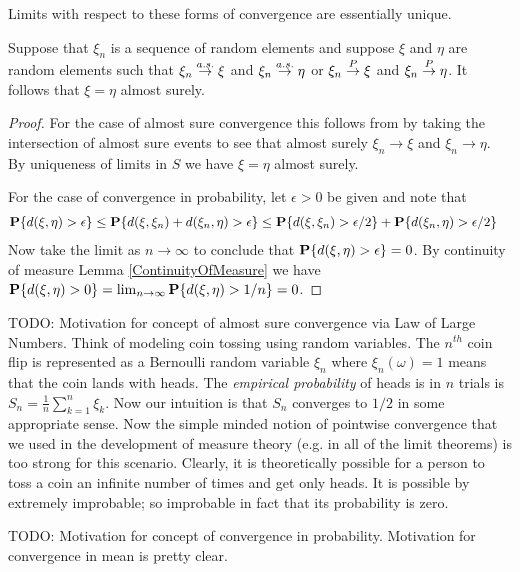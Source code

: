 Limits with respect to these forms of convergence are essentially
unique.
\begin{prop}\label{AlmostSureUniquenessOfLimits}Suppose that $\xi_n$ is a sequence of random elements and
  suppose $\xi$ and $\eta$ are random elements such that $\xi_n \overset{a.s.}\to
  \xi$ and $\xi_n \overset{a.s.}\to \eta$ or $\xi_n \overset{P}\to
  \xi$ and $\xi_n \overset{P}\to \eta$.  It follows that $\xi = \eta$
  almost surely.
\end{prop}
\begin{proof}
For the case  of almost sure convergence this follows from by taking
the intersection of almost sure events to see that almost surely
$\xi_n \to \xi$ and $\xi_n \to \eta$.  By uniqueness of limits in $S$
we have $\xi = \eta$ almost surely.

For the case of convergence in probability, let $\epsilon > 0$ be
given and note that 
\begin{align*}
\textbf{P}\{ d(\xi, \eta) > \epsilon\} &\leq \textbf{P}\{ d(\xi,
  \xi_n )  + d(\xi_n , \eta) > \epsilon\} \leq  \textbf{P}\{ d(\xi,
  \xi_n ) > \epsilon/2 \} + \textbf{P}\{ d(\xi_n , \eta) > \epsilon/2\} 
\end{align*}
Now take the limit as $n \to \infty$ to conclude that $\textbf{P}\{
  d(\xi, \eta) > \epsilon\} = 0$.  By continuity of measure Lemma
\ref{ContinuityOfMeasure} we have $\textbf{P}\{d(\xi, \eta) > 0\} =
\lim_{n \to \infty} \textbf{P}\{d(\xi, \eta) > 1/n\} = 0$.
\end{proof}

TODO: Motivation for concept of almost sure convergence via Law of
Large Numbers.  Think of modeling coin tossing using random
variables.  The $n^{th}$ coin flip is represented as a Bernoulli
random variable $\xi_n$ where $\xi_n(\omega) = 1$ means that the coin
lands with heads.  The \emph{empirical probability} of heads is in $n$
trials is $S_n = \frac{1}{n} \sum_{k=1}^n \xi_k$.  Now our intuition
is that $S_n$ converges to $1/2$ in some appropriate sense.  Now the
simple minded notion of pointwise convergence that we used in the
development of measure theory (e.g. in all of the limit theorems)
is too strong for this scenario.  Clearly, it is theoretically
possible for a person to toss a coin an infinite number of times and
get only heads.  It is possible by extremely improbable; so improbable
in fact that its probability is zero.

TODO: Motivation for concept of convergence in probability.
Motivation for convergence in mean is pretty clear.

